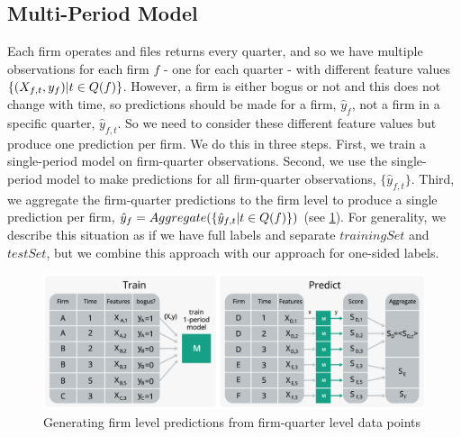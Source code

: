 \subsection{Multi-Period Model}
\label{subsec:multi-period}
Each firm operates and files returns every quarter, and so we have multiple observations for each firm $f$ - one for each quarter - with different feature values $\{(X_{f,t},y_f)\space | \space t \in Q(f)\}$. However, a firm is either bogus or not and this does not change with time, so predictions should be made for a firm, $\hat{y}_f$, not a firm in a specific quarter, $\hat{y}_{f,t}$. So we need to consider these different feature values but produce one prediction per firm. We do this in three steps. First, we train a single-period model on firm-quarter observations. Second, we use the single-period model to make predictions for all firm-quarter observations, $\{\hat{y}_{f,t}\}$. Third, we aggregate the firm-quarter predictions to the firm level to produce a single prediction per firm, $\hat{y}_f=Aggregate(\{\hat{y}_{f,t}\space|t \in Q(f)\})$ (see \cref{fig:aggregation}). For generality, we describe this situation as if we have full labels and separate $trainingSet$ and $testSet$, but we combine this approach with our approach for one-sided labels.

\begin{figure}
  \includegraphics[width=1\columnwidth]{graphs/MultiplePeriodPrediction.png}
  \caption{Generating firm level predictions from firm-quarter level data points}
  \label{fig:aggregation}
\end{figure}

